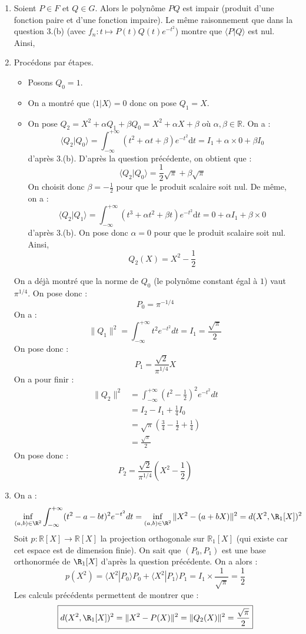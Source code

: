 \documentclass[twoside,french,11pt]{VcCours}
\newcommand{\enc}[1]{\fbox{#1}}
\newcommand{\dt}{\text{d}t}
\renewcommand{\l}{\langle }
\renewcommand{\r}{\rangle }
\begin{document}
\begin{enumerate}
    \item Soient $P \in F$ et $Q \in G$. Alors le polynôme $PQ$ est impair (produit d'une fonction paire et d'une fonction impaire). Le même raisonnement que dans la question 3.(b) (avec $f_n : t \mapsto P(t)Q(t) e^{-t^2}$) montre que $\l P|Q\r$ est nul. Ainsi,
  \enc{$F\perp G$}
    
    \item Procédons par étapes.
    \begin{itemize}
  \item Posons $Q_0=1$. 
  \item On a montré que $\l 1|X\r =0$ donc on pose $Q_1=X$.
  \item On pose $Q_2 = X^2+ \alpha Q_1+ \beta Q_0 = X^2 + \alpha X+ \beta$ où $\alpha, \beta \in \mathbb{R}$. On a :
  $$ \l Q_2|Q_0\r = \int_{- \infty}^{+ \infty} (t^2+ \alpha t+ \beta) e^{-t^2} \dt = I_1 + \alpha \times 0 + \beta I_0 $$
  d'après 3.(b). D'après la question précédente, on obtient que :
  $$ \l Q_2|Q_0\r = \dfrac{1}{2} \sqrt{\pi} + \beta \sqrt{\pi}$$
  On choisit donc $\beta = - \tfrac{1}{2}$ pour que le produit scalaire soit nul. De même, on a :
  $$  \l Q_2|Q_1\r = \int_{- \infty}^{+ \infty} (t^3+ \alpha t^2+ \beta t) e^{-t^2} \dt = 0 + \alpha I_1 + \beta \times 0 $$
  d'après 3.(b). On pose donc $\alpha=0$ pour que le produit scalaire soit nul. Ainsi,
  $$ Q_2(X) = X^2 - \dfrac{1}{2}$$
    \end{itemize}
  On a déjà montré que la norme de $Q_0$ (le polynôme constant égal à $1$) vaut $\pi^{1/4}$. On pose donc :
  $$ \boxed{P_0 = \pi^{-1/4}}$$
  On a :
  $$ \|Q_1\|^2=\int_{-\infty}^{+\infty}t^2e^{-t^2}dt=I_1=\frac{\sqrt{\pi}}{2}$$
  On pose donc :
  $$\boxed{P_1=\frac{\sqrt{2}}{\pi^{1/4}}X}$$
  On a pour finir :
  \begin{align*}
  \|Q_2\|^2 & =\int_{-\infty}^{+\infty}\left(t^2-\frac{1}{2}\right)^2e^{-t^2}dt \\
  &=I_2-I_1+\frac{1}{4}I_0 \\
  &=\sqrt{\pi}\left(\frac{3}{4}-\frac{1}{2}+\frac{1}{4}\right)
  \\& =\frac{\sqrt{\pi}}{2}
  \end{align*}
  On pose donc : 
  $$ \boxed{P_2=\frac{\sqrt{2}}{\pi^{1/4}}\left(X^2-\frac{1}{2}\right)}$$ 
  
    
    \item On a :
    $$\inf_{(a,b)\in\R^2}\int_{-\infty}^{+\infty}(t^2-a-bt)^2e^{-t^2}dt=\inf_{(a,b)\in\R^2}\|X^2-(a+bX)\|^2=d(X^2,\R_1[X])^2$$
  Soit $p : \mathbb{R}[X] \rightarrow \mathbb{R}[X]$ la projection orthogonale sur $\mathbb{R}_1[X]$ (qui existe car cet espace est de dimension finie). On sait que $(P_0,P_1)$ est une base orthonormée de $\R_1[X]$ d'après la question précédente. On a alors :
  $$p(X^2)  =\l X^2| P_0\r P_0+\l X^2| P_1\r P_1=  I_1 \times \dfrac{1}{\sqrt{\pi}} = \dfrac{1}{2}$$
  Les calculs précédents permettent de montrer que :
  $$\boxed{d(X^2,\R_1[X])^2=\|X^2-P(X)\|^2=\|Q_2(X)\|^2=\frac{\sqrt{\pi}}{2}}$$
    
  \end{enumerate}
   
\end{document}

